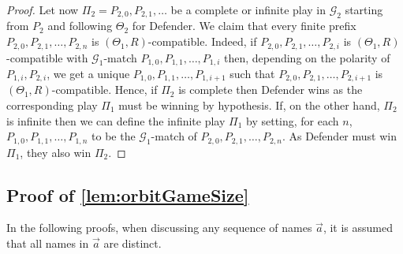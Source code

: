 \documentclass[10pt,a4paper]{article}
\theoremstyle{definition}
\theoremstyle{remark}
\newcommand\Gcal{\mathcal{G}}
\begin{document}
\begin{proof}
Let now $\Pi_2=P_{2,0},P_{2,1},\dots$ be a complete or infinite play in $\Gcal_2$ starting from $P_2$ and following $\Theta_2$ for Defender. We claim that every finite prefix $P_{2,0},P_{2,1},\dots,P_{2,n}$ is $(\Theta_1,R)$-compatible. Indeed, if $P_{2,0},P_{2,1},\dots,P_{2,i}$ is $(\Theta_1,R)$-compatible with $\Gcal_1$-match $P_{1,0},P_{1,1},\dots,P_{1,i}$ then, depending on the polarity of $P_{1,i},P_{2,i}$, we get a unique  $P_{1,0},P_{1,1},\dots,P_{1,i+1}$ such that $P_{2,0},P_{2,1},\dots,P_{2,i+1}$ is $(\Theta_1,R)$-compatible. Hence, if $\Pi_2$ is complete then Defender wins as the corresponding play $\Pi_1$ must be winning by hypothesis. If, on the other hand, $\Pi_2$ is infinite then we can define the infinite play $\Pi_1$ by setting, for each $n$, $P_{1,0},P_{1,1},\dots,P_{1,n}$ to be the $\Gcal_1$-match of $P_{2,0},P_{2,1},\dots,P_{2,n}$. As Defender must win $\Pi_1$, they also win $\Pi_2$.
\end{proof}

\subsection{Proof of \cref{lem:orbitGameSize}}\label{app:orbitGameSize}









In the following proofs, when discussing any sequence of names $\vec a$, it is assumed that all names in $\vec a$ are distinct.
\end{document}
